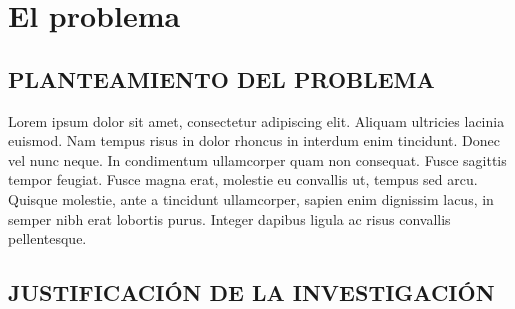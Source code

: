 
\chapter{El problema} %

\label{Capitulo1} %


\section{PLANTEAMIENTO DEL PROBLEMA}

Lorem ipsum dolor sit amet, consectetur adipiscing elit. Aliquam ultricies lacinia euismod. Nam tempus risus in dolor rhoncus in interdum enim tincidunt. Donec vel nunc neque. In condimentum ullamcorper quam non consequat. Fusce sagittis tempor feugiat. Fusce magna erat, molestie eu convallis ut, tempus sed arcu. Quisque molestie, ante a tincidunt ullamcorper, sapien enim dignissim lacus, in semper nibh erat lobortis purus. Integer dapibus ligula ac risus convallis pellentesque.

\newpage
\section{JUSTIFICACIÓN DE LA INVESTIGACIÓN}

